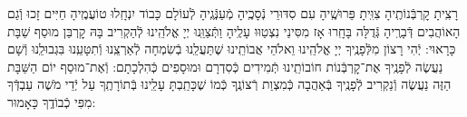 \documentclass[twoside, openany, parskip=half, 11pt]{book}
\begin{document}
%
%
%
%
%
%



\sepline


 רָצִֽיתָ קׇרְבְּֿנוֹתֶֽיהָ צִוִּֽיתָ פֵּרוּשֶֽׁיהָ עִם סִדּוּרֵי נְֿסָכֶֽיהָ מְֿעַנְּֿגֶֽיהָ לְֿעוֹלָם כָּבוֹד יִנְחָֽלוּ טוֹעֲמֶֽיהָ חַיִּים זָכוּ וְֿגַם הָאוֹהֲבִים דְּֿבָרֶֽיהָ גְּֿדֻלָּה בָּחָֽרוּ אָז מִסִּינַי נִצְטַוּוּ עָלֶֽיהָ
וַתְּֿצַוֵּֽנוּ יְיָ אֱלֹהֵֽינוּ לְֿהַקְרִיב בָּהּ קׇרְבַּן מוּסַף שַׁבָּת כָּרָאוּי: יְֿהִי רָצוֹן מִלְּֿפָנֶֽיךָ יְיָ אֱלֹהֵֽינוּ וֵאלֹהֵי אֲבוֹתֵֽינוּ שֶׁתַּעֲלֵֽנוּ בְֿשִׂמְחָה לְֿאַרְצֵֽנוּ וְֿתִטָּעֵֽנוּ בִּגְבוּלֵֽנוּ וְֿשָׁם נַעֲשֶׂה לְֿפָנֶֽיךָ אֶת־קׇרְבְּֿנוֹת חוֹבוֹתֵֽינוּ תְּֿמִידִים כְּֿסִדְרָם וּמוּסָפִים כְּֿהִלְכָתָם: וְֿאֶת־מוּסַף יוֹם הַשַּׁבָּת הַזֶּה נַעֲשֶׂה וְֿנַקְרִיב לְֿפָנֶֽיךָ בְּֿאַהֲבָה כְּֿמִצְוַת רְֿצוֹנֶֽךָ כְּֿמוֹ שֶׁכָּתַֽבְתָּ עָלֵֽינוּ בְּֿתוֹרָתֶֽךָ עַל יְֿדֵי מֹשֶׁה עַבְדְּֿךָ מִפִּי כְֿבוֹדֶֽךָ כָּאָמוּר:
\end{document}
